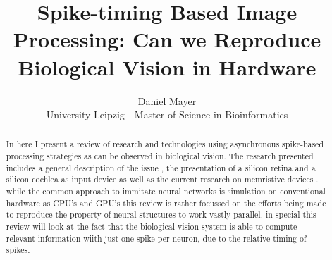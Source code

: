 \documentclass{SeminarV2}
\begin{document}
\title{Spike-timing Based Image Processing: Can we Reproduce Biological Vision in Hardware}

\author{Daniel Mayer 
%
\vspace{.3cm}\\
%
University Leipzig - Master of Science in Bioinformatics}
%

\maketitle

\begin{abstract}
In here I present a review of research and technologies using asynchronous spike-based processing strategies as can be observed in biological vision.
The research presented includes a general description of the issue \cite{thorpe_spike-based_2012}, the presentation of a 
silicon retina \cite{lichtsteiner_128_2008} and a silicon cochlea \cite{} as input device as well as the current research on memristive devices \cite{jo_high-density_2009}.
while the common approach to immitate neural networks is simulation on conventional hardware as CPU's and GPU's this review is rather focussed on the efforts being made to reproduce the property of neural structures to work vastly parallel. in special this review will look at the fact that the biological vision system is able to compute relevant information wiith just one spike per neuron, due to the relative timing of spikes.
\end{abstract}
\end{document}
